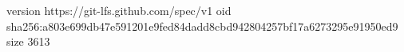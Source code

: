 version https://git-lfs.github.com/spec/v1
oid sha256:a803e699db47e591201e9fed84dadd8cbd942804257bf17a6273295e91950ed9
size 3613
